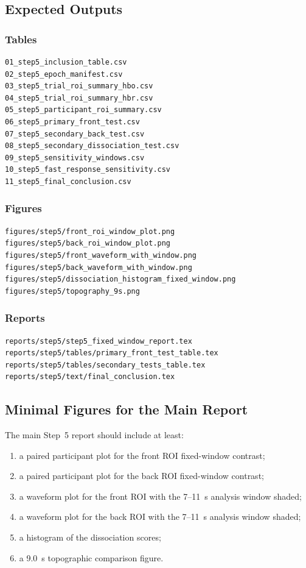 \subsection{Expected Outputs}

\subsubsection*{Tables}
\begin{verbatim}
01_step5_inclusion_table.csv
02_step5_epoch_manifest.csv
03_step5_trial_roi_summary_hbo.csv
04_step5_trial_roi_summary_hbr.csv
05_step5_participant_roi_summary.csv
06_step5_primary_front_test.csv
07_step5_secondary_back_test.csv
08_step5_secondary_dissociation_test.csv
09_step5_sensitivity_windows.csv
10_step5_fast_response_sensitivity.csv
11_step5_final_conclusion.csv
\end{verbatim}

\subsubsection*{Figures}
\begin{verbatim}
figures/step5/front_roi_window_plot.png
figures/step5/back_roi_window_plot.png
figures/step5/front_waveform_with_window.png
figures/step5/back_waveform_with_window.png
figures/step5/dissociation_histogram_fixed_window.png
figures/step5/topography_9s.png
\end{verbatim}

\subsubsection*{Reports}
\begin{verbatim}
reports/step5/step5_fixed_window_report.tex
reports/step5/tables/primary_front_test_table.tex
reports/step5/tables/secondary_tests_table.tex
reports/step5/text/final_conclusion.tex
\end{verbatim}

\subsection{Minimal Figures for the Main Report}
The main Step~5 report should include at least:
\begin{enumerate}
    \item a paired participant plot for the front ROI fixed-window contrast;
    \item a paired participant plot for the back ROI fixed-window contrast;
    \item a waveform plot for the front ROI with the 7--11~s analysis window shaded;
    \item a waveform plot for the back ROI with the 7--11~s analysis window shaded;
    \item a histogram of the dissociation scores;
    \item a 9.0~s topographic comparison figure.
\end{enumerate}

